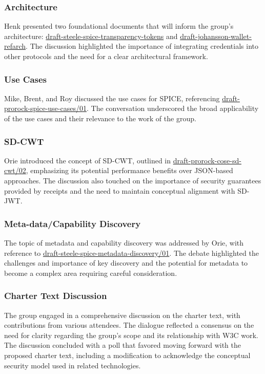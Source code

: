 \documentclass{article}
\begin{document}
\subsubsection{Architecture}
Henk presented two foundational documents that will inform the group's architecture: \href{https://datatracker.ietf.org/doc/html/draft-steele-spice-transparency-tokens}{draft-steele-spice-transparency-tokens} and \href{https://leifj.github.io/wallet-refarch/draft-johansson-wallet-refarch.html}{draft-johansson-wallet-refarch}. The discussion highlighted the importance of integrating credentials into other protocols and the need for a clear architectural framework.

\subsubsection{Use Cases}
Mike, Brent, and Roy discussed the use cases for SPICE, referencing \href{https://datatracker.ietf.org/doc/html/draft-prorock-spice-use-cases/01}{draft-prorock-spice-use-cases/01}. The conversation underscored the broad applicability of the use cases and their relevance to the work of the group.

\subsubsection{SD-CWT}
Orie introduced the concept of SD-CWT, outlined in \href{https://datatracker.ietf.org/doc/html/draft-prorock-cose-sd-cwt/02}{draft-prorock-cose-sd-cwt/02}, emphasizing its potential performance benefits over JSON-based approaches. The discussion also touched on the importance of security guarantees provided by receipts and the need to maintain conceptual alignment with SD-JWT.

\subsubsection{Meta-data/Capability Discovery}
The topic of metadata and capability discovery was addressed by Orie, with reference to \href{https://datatracker.ietf.org/doc/html/draft-steele-spice-metadata-discovery/01}{draft-steele-spice-metadata-discovery/01}. The debate highlighted the challenges and importance of key discovery and the potential for metadata to become a complex area requiring careful consideration.

\subsubsection{Charter Text Discussion}
The group engaged in a comprehensive discussion on the charter text, with contributions from various attendees. The dialogue reflected a consensus on the need for clarity regarding the group's scope and its relationship with W3C work. The discussion concluded with a poll that favored moving forward with the proposed charter text, including a modification to acknowledge the conceptual security model used in related technologies.
\end{document}

